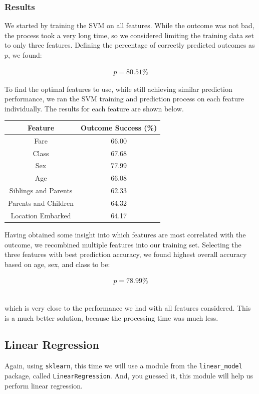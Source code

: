 \documentclass[11pt,a4paper]{article}
\begin{document}
\subsubsection{Results}
We started by training the SVM on all features. While the outcome was not bad, the process took a very long time, so we considered limiting the training data set to only three features. Defining the percentage of correctly predicted outcomes as $p$, we found:

\begin{align*}
p = 80.51\%
\end{align*}

To find the optimal features to use, while still achieving similar prediction performance, we ran the SVM training and prediction process on each feature individually. The results for each feature are shown below.

\begin{center}
 \begin{tabular}{||c | c||} 
 \hline
 Feature & Outcome Success (\%) \\ [0.5ex] 
 \hline\hline
 Fare & 66.00 \\ 
 \hline
 Class & 67.68 \\
 \hline
 Sex & 77.99 \\
 \hline
 Age & 66.08 \\
 \hline
 Siblings and Parents & 62.33 \\
 \hline
 Parents and Children & 64.32 \\
 \hline
 Location Embarked & 64.17 \\ [1ex] 
 \hline
\end{tabular}
\end{center}

Having obtained some insight into which features are most correlated with the outcome, we recombined multiple features into our training set. Selecting the three features with best prediction accuracy, we found highest overall accuracy based on age, sex, and class to be:

\begin{align*}
p = 78.99\%
\end{align*}\

which is very close to the performance we had with all features considered. This is a much better solution, because the processing time was much less.

\subsection{Linear Regression}
Again, using \verb|sklearn|, this time we will use a module from the \verb|linear_model| package, called \verb|LinearRegression|. And, you guessed it, this module will help us perform linear regression. 
\end{document}
